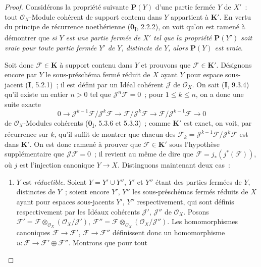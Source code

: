 \begin{proof}
Considérons la propriété suivante $\boldsymbol{P}(Y)$ d'une partie fermée $Y$ de $X'$~:
tout $\mathcal O_X$-Module cohérent de support contenu dans $Y$ appartient à
$\boldsymbol{K}'$. En vertu du principe de récurrence noethérienne (\textbf{0}\textsubscript{I},
2.2.2), on voit qu'on est ramené à démontrer que \emph{si $Y$ est une partie
fermée de $X'$ tel que la propriété $\boldsymbol{P}(Y')$ soit vraie pour toute partie
fermée $Y'$ de $Y$, distincte de $Y$, alors $\boldsymbol{P}(Y)$ est vraie}.

Soit donc $\mathcal F\in\boldsymbol{K}$ à support contenu dans $Y$ et prouvons que
$\mathcal F\in\boldsymbol{K}'$. Désignons encore par $Y$ le sous-préschéma fermé réduit de
$X$ ayant $Y$ pour espace sous-jacent (\textbf{I}, 5.2.1)~; il est défini par un Idéal
cohérent $\mathcal J$ de $\mathcal O_X$. On sait (\textbf{I}, 9.3.4) qu'il existe un
entier $n>0$ tel que $\mathcal J^n\mathcal F=0$~; pour $1\leq k\leq n$, on a
donc une suite exacte
\[
0\longrightarrow
\mathcal J^{k-1}\mathcal F/\mathcal J^k\mathcal F
\longrightarrow \mathcal F/\mathcal J^k\mathcal F
\longrightarrow \mathcal F/\mathcal J^{k-1}\mathcal F
\longrightarrow0
\]
de $\mathcal O_X$-Modules cohérents (\textbf{0}\textsubscript{I}, 5.3.6 et 5.3.3)~;
comme $\boldsymbol{K}'$ est exact, on voit, par récurrence sur $k$, qu'il suffit de montrer
que chacun des
$\mathcal F_k=\mathcal J^{k-1}\mathcal F/\mathcal J^k\mathcal F$ est dans
$\boldsymbol{K}'$. On est donc ramené à prouver que $\mathcal F\in\boldsymbol{K}'$ sous l'hypothèse
supplémentaire que $\mathcal J\mathcal F=0$~; il revient au même de dire que
$\mathcal F=j_*(j^*(\mathcal F))$, où $j$ est l'injection canonique
$Y\to X$. Distinguons maintenant deux cas~:
\begin{enumerate}
\item[\textit{a)}] $Y$ est \emph{réductible}. Soient $Y=Y'\cup Y''$, $Y'$ et $Y''$
étant des parties fermées de $Y$, distinctes de $Y$~; soient encore $Y'$,
$Y''$ les sous-préschémas fermés réduits de $X$ ayant pour espaces
sous-jacents $Y'$, $Y''$ respectivement, qui sont définis respectivement par
les Idéaux cohérents $\mathcal J'$, $\mathcal J''$ de $\mathcal O_X$. Posons
$\mathcal F'=\mathcal F\otimes_{\mathcal O_X}
(\mathcal O_X/\mathcal J')$,
$\mathcal F''=\mathcal F\otimes_{\mathcal O_X}
(\mathcal O_X/\mathcal J'')$.
Les homomorphismes canoniques $\mathcal F\to\mathcal F'$,
$\mathcal F\to\mathcal F''$ définissent donc un homomorphisme
$u:\mathcal F\to\mathcal F'\oplus\mathcal F''$. Montrons que pour tout

\end{enumerate}
\end{proof}
